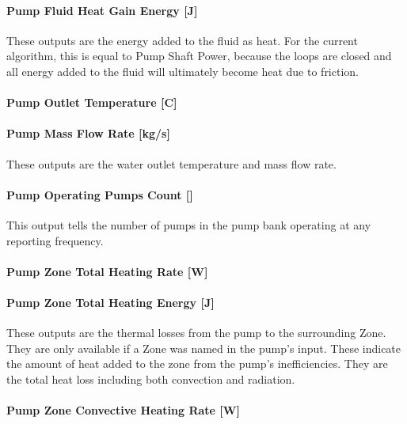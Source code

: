 \paragraph{Pump Fluid Heat Gain Energy {[}J{]}}\label{pump-fluid-heat-gain-energy-j-3}

These outputs are the energy added to the fluid as heat. For the current algorithm, this is equal to Pump Shaft Power, because the loops are closed and all energy added to the fluid will ultimately become heat due to friction.

\paragraph{Pump Outlet Temperature {[}C{]}}\label{pump-outlet-temperature-c-3}

\paragraph{Pump Mass Flow Rate {[}kg/s{]}}\label{pump-mass-flow-rate-kgs-3}

These outputs are the water outlet temperature and mass flow rate.

\paragraph{Pump Operating Pumps Count {[]}}\label{pump-operating-pumps-count}

This output tells the number of pumps in the pump bank operating at any reporting frequency.

\paragraph{Pump Zone Total Heating Rate {[}W{]}}\label{pump-zone-total-heating-rate-w-3}

\paragraph{Pump Zone Total Heating Energy {[}J{]}}\label{pump-zone-total-heating-energy-j-3}

These outputs are the thermal losses from the pump to the surrounding Zone. They are only available if a Zone was named in the pump's input. These indicate the amount of heat added to the zone from the pump's inefficiencies. They are the total heat loss including both convection and radiation.

\paragraph{Pump Zone Convective Heating Rate {[}W{]}}\label{pump-zone-convective-heating-rate-w-3}

